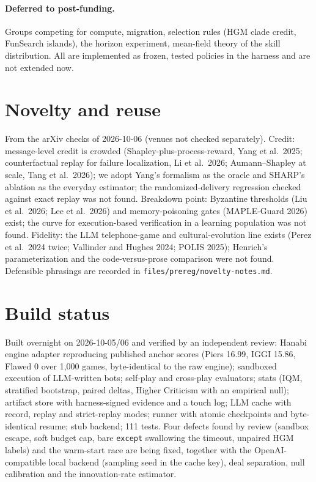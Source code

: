 \documentclass[11pt]{article}
\begin{document}
\paragraph{Deferred to post-funding.} Groups competing for compute, migration, selection rules (HGM clade credit,
FunSearch islands), the horizon experiment, mean-field theory of the skill distribution. All are implemented as
frozen, tested policies in the harness and are not extended now.

\section{Novelty and reuse}\label{sec:novelty}

From the arXiv checks of 2026-10-06 (venues not checked separately). Credit: message-level credit is crowded
(Shapley-plus-process-reward, Yang et al.\ 2025; counterfactual replay for failure localization, Li et al.\ 2026;
Aumann--Shapley at scale, Tang et al.\ 2026); we adopt Yang's formalism as the oracle and SHARP's ablation as the
everyday estimator; the randomized-delivery regression checked against exact replay was not found. Breakdown point:
Byzantine thresholds (Liu et al.\ 2026; Lee et al.\ 2026) and memory-poisoning gates (MAPLE-Guard 2026) exist; the
curve for execution-based verification in a learning population was not found. Fidelity: the LLM telephone-game and
cultural-evolution line exists (Perez et al.\ 2024 twice; Vallinder and Hughes 2024; POLIS 2025); Henrich's
parameterization and the code-versus-prose comparison were not found. Defensible phrasings are recorded in
\texttt{files/prereg/novelty-notes.md}.

\section{Build status}\label{sec:status}

Built overnight on 2026-10-05/06 and verified by an independent review: Hanabi engine adapter reproducing published
anchor scores (Piers 16.99, IGGI 15.86, Flawed 0 over 1,000 games, byte-identical to the raw engine); sandboxed
execution of LLM-written bots; self-play and cross-play evaluators; stats (IQM, stratified bootstrap, paired deltas,
Higher Criticism with an empirical null); artifact store with harness-signed evidence and a touch log; LLM cache with
record, replay and strict-replay modes; runner with atomic checkpoints and byte-identical resume; stub backend; 111
tests. Four defects found by review (sandbox escape, soft budget cap, bare \texttt{except} swallowing the timeout,
unpaired HGM labels) and the warm-start race are being fixed, together with the OpenAI-compatible local backend
(sampling seed in the cache key), deal separation, null calibration and the innovation-rate estimator.
\end{document}
